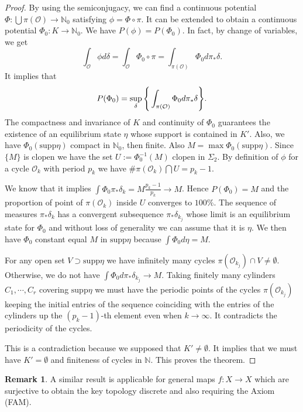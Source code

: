 \documentclass[12 pt]{amsart}
\theoremstyle{definition}
\newtheorem{remark}[theorem]{Remark}
\begin{document}
\begin{proof}
	By using the semiconjugacy, we can find a continuous potential $\Phi: \bigcup \pi(\mathcal{O}) \to \mathbb{N}_{0}$ satisfying $\phi = \Phi \circ \pi$. It can be extended to obtain a continuous potential $\Phi_{0}: K \to \mathbb{N}_{0}$. We have $P(\phi) = P(\Phi_{0})$. In fact, by change of variables, we get
	\[
	\int_{\mathcal{O}} \phi d\delta = \int_{\mathcal{O}} \Phi_{0} \circ \pi = \int_{\pi(\mathcal{O})} \Phi_{0} d\pi_{*} \delta.
	\] 
	It implies that
	\[
	P(\Phi_{0}) = \sup_{\delta}\Bigg{\{} \int_{\pi(\mathcal{O})} \Phi_{0} d\pi_{*} \delta\Bigg{\}}.
	\]
	The compactness and invariance of $K$ and continuity of $\Phi_{0}$ guarantees the existence of an equilibrium state $\eta$ whose support is contained in $K'$. Also, we have $\Phi_{0}(\text{supp}\eta)$ compact in $\mathbb{N}_{0}$, then finite. Also $M = \max \Phi_{0}(\text{supp}\eta)$. Since $\{M\}$ is clopen we have the set $U := \Phi_{0}^{-1}(M)$ clopen in $\Sigma_{2}$. By definition of $\phi$ for a cycle $\mathcal{O}_{k}$  with period $p_{k}$ we have $\# \pi(\mathcal{O}_{k}) \bigcap U = p_{k}-1$.
	
	We know that it implies $\int \Phi_{0} \pi_{*} \delta_{k} = M\frac{p_{k} - 1}{p_{k}} \to M$. Hence $P(\Phi_{0}) = M$ and the proportion of point of $\pi(\mathcal{O}_{k})$ inside $U$ converges to $100\%$. The sequence of measures $\pi_{*}\delta_{k}$ has a convergent subsequence $\pi_{*}\delta_{k_{j}}$ whose limit is an equilibrium state for $\Phi_{0}$ and without loss of generality we can assume that it is $\eta$. We then have $\Phi_{0}$ constant equal $M$ in $\text{supp}\eta$ because $\int \Phi_{0} d\eta = M$. 
	
	For any open set $V \supset \text{supp}\eta$ we have infinitely many cycles $\pi(\mathcal{O}_{k_{j}}) \cap V \neq \emptyset$. Otherwise, we do not have $\int \Phi_{0} d\pi_{*}\delta_{k_{j}} \to M$. Taking finitely many cylinders $C_{1}, \cdots, C_{r}$ covering $\text{supp}\eta$ we must have the periodic points of the cycles  $\pi(\mathcal{O}_{k_{j}})$ keeping the initial entries  of the sequence coinciding with the entries of the cylinders up the $(p_{k} - 1)$-th element even when $k \to \infty$. It contradicts the periodicity of the cycles. 
	
	This is a contradiction because we supposed that $K'\neq \emptyset$. It implies that we must have $K' = \emptyset$ and finiteness of cycles in $\mathbb{N}$. This proves the theorem. 
\end{proof}

\begin{remark}
	A similar result is applicable for general maps $f : X \to X$ which are surjective to obtain the key topology discrete and also requiring the Axiom (FAM).
\end{remark}
\end{document}
